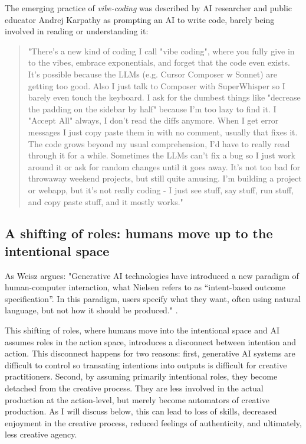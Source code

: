 The emerging practice of \textit{vibe-coding} was described by AI researcher and public educator Andrej Karpathy as prompting an AI to write code, barely being involved in reading or understanding it:

\begin{quote}
"There's a new kind of coding I call "vibe coding", where you fully give in to the vibes, embrace exponentials, and forget that the code even exists. It's possible because the LLMs (e.g. Cursor Composer w Sonnet) are getting too good. Also I just talk to Composer with SuperWhisper so I barely even touch the keyboard. I ask for the dumbest things like "decrease the padding on the sidebar by half" because I'm too lazy to find it. I "Accept All" always, I don't read the diffs anymore. When I get error messages I just copy paste them in with no comment, usually that fixes it. The code grows beyond my usual comprehension, I'd have to really read through it for a while. Sometimes the LLMs can't fix a bug so I just work around it or ask for random changes until it goes away. It's not too bad for throwaway weekend projects, but still quite amusing. I'm building a project or webapp, but it's not really coding - I just see stuff, say stuff, run stuff, and copy paste stuff, and it mostly works."
\end{quote}

\subsection{A shifting of roles: humans move up to the intentional space}
As Weisz argues: "Generative AI technologies have introduced a new paradigm of human-computer interaction, what Nielsen refers to as “intent-based outcome specification”. In this paradigm, users specify what they want, often using natural language, but not how it should be produced." \cite{Weisz2024-io}.

This shifting of roles, where humans move into the intentional space and AI assumes roles in the action space, introduces a disconnect between intention and action. This disconnect happens for two reasons: first, generative AI systems are difficult to control so transating intentions into outputs is difficult for creative practitioners. Second, by assuming primarily intentional roles, they become detached from the creative process. They are less involved in the actual production at the action-level, but merely become automators of creative production. As I will discuss below, this can lead to loss of skills, decreased enjoyment in the creative process, reduced feelings of authenticity, and ultimately, less creative agency.


